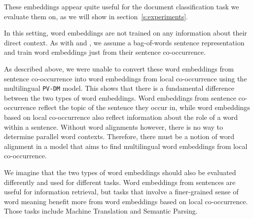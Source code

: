 These embeddings appear quite useful for the document classification task we evaluate them on, as we will show in section~\ref{s:experiments}.

In this setting, word embeddings are not trained on any information about their direct context. 
As with \cite{hermann2013multilingual} and \cite{SarathChandar2014autoencoder}, we assume a bag-of-words sentence representation and train word embeddings just from their sentence co-occurrence.

As described above, we were unable to convert these word embeddings from sentence co-occurrence into word embeddings from local co-occurrence using the multilingual \texttt{PV-DM} model.
This shows that there is a fundamental difference between the two types of word embeddings.
Word embeddings from sentence co-occurrence reflect the topic of the sentence they occur in, while word embeddings based on local co-occurrence also reflect information about the role of a word within a sentence.
Without word alignments however, there is no way to determine parallel word contexts.
Therefore, there must be a notion of word alignment in a model that aims to find multilingual word embeddings from local co-occurrence.

We imagine that the two types of word embeddings should also be evaluated differently and used for different tasks.
Word embeddings from sentences are useful for information retrieval, but tasks that involve a finer-grained sense of word meaning benefit more from word embeddings based on local co-occurrence.
Those tasks include Machine Translation and Semantic Parsing.